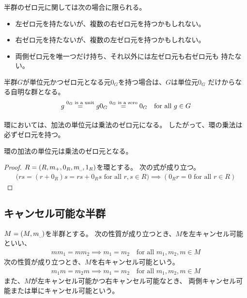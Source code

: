 	半群のゼロ元に関しては次の場合に限られる。
	\begin{itemize}\setlength{\itemsep}{-1mm} %
		\item 左ゼロ元を持たないが、複数の右ゼロ元を持つかもしれない。
		\item 右ゼロ元を持たないが、複数の左ゼロ元を持つかもしれない。
		\item 両側ゼロ元を唯一つだけ持ち、それ以外には左ゼロ元も右ゼロ元も
		持たない。
	\end{itemize} %

	半群$G$が単位元かつゼロ元となる元$0_G$を持つ場合は、$G$は単位元$0_G$
	だけからなる自明な群となる。
	\begin{equation*}\begin{split}
		g \overset{\text{$0_G$ is a unit}}{\underset{}{=}} g0_G
		\overset{\text{$0_G$ is a zero}}{\underset{}{=}} 0_G
		\quad\text{for all }g\in G
	\end{split}\end{equation*}

	環においては、加法の単位元は乗法のゼロ元になる。
	したがって、環の乗法は必ずゼロ元を持つ。

	\begin{proposition}[環の乗法のゼロ元]\label{prop:環の乗法のゼロ元} %
		環の加法の単位元は乗法のゼロ元となる。
	\end{proposition} %
	\begin{proof} $R=(R,m_+,0_R,m_\myspace,1_R)$を環とする。
	次の式が成り立つ。
	\begin{equation*}\begin{split}
		\bigl(rs = (r + 0_R)s = rs + 0_Rs \text{ for all }r,s\in R\bigr)
		\implies (0_Rr = 0 \text{ for all }r\in R)
	\end{split}\end{equation*}
	\end{proof}
\subsection{キャンセル可能な半群}\label{s2:キャンセル可能な半群} %
	\begin{definition}[キャンセル可能な半群]
	\label{def:キャンセル可能な半群} %
		$M=(M,m_\myspace)$を半群とする。
		次の性質が成り立つとき、$M$を左キャンセル可能といい、
		\begin{equation*}\begin{split}
			mm_1 = mm_2 \implies m_1 = m_2 \quad\text{for all }m_1,m_2,m\in M
		\end{split}\end{equation*}
		次の性質が成り立つとき、$M$を右キャンセル可能という。
		\begin{equation*}\begin{split}
			m_1m = m_2m \implies m_1 = m_2 \quad\text{for all }m_1,m_2,m\in M
		\end{split}\end{equation*}
		また、$M$が左キャンセル可能かつ右キャンセル可能なとき、
		両側キャンセル可能または単にキャンセル可能という。
	\end{definition} %

